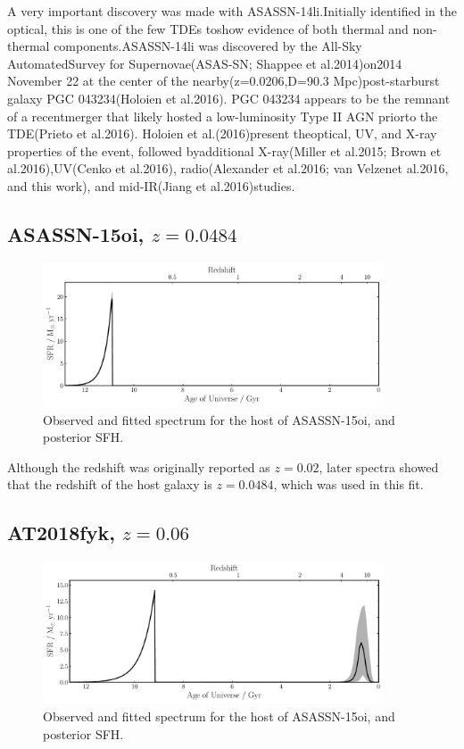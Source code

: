 \documentclass[a4paper,11pt]{article}
\begin{document}
A very important discovery was made with ASASSN-14li.Initially identified in the optical, this is one of the few TDEs toshow evidence of both thermal and non-thermal components.ASASSN-14li was discovered by the All-Sky AutomatedSurvey for Supernovae(ASAS-SN; Shappee et al.2014)on2014 November 22 at the center of the nearby(z=0.0206,D=90.3 Mpc)post-starburst galaxy PGC 043234(Holoien et al.2016). PGC 043234 appears to be the remnant of a recentmerger that likely hosted a low-luminosity Type II AGN priorto the TDE(Prieto et al.2016). Holoien et al.(2016)present theoptical, UV, and X-ray properties of the event, followed byadditional X-ray(Miller et al.2015; Brown et al.2016),UV(Cenko et al.2016), radio(Alexander et al.2016; van Velzenet al.2016, and this work), and mid-IR(Jiang et al.2016)studies.\cite{Romero_Canizales_2016}


\newpage
\subsection{ASASSN-15oi, $z=0.0484$}\label{sec:ASASSN-15oi}
\begin{figure}[h!]
\centering
  \includegraphics[width=0.9\textwidth]{../pipes/plots/r4_dblplaw_burst/ASASSN15oi_sfh.pdf}
  \caption{Observed and fitted spectrum for the host of ASASSN-15oi, and posterior SFH.}
  \label{}
\end{figure}

Although the redshift was originally reported as $z=0.02$, later spectra showed that the redshift of the host galaxy is $z=0.0484$, which was used in this fit.\cite{Arcavi_2015, Holoien_2016b}

\newpage
\subsection{AT2018fyk, $z=0.06$}\label{sec:AT2018fyk}
\begin{figure}[h!]
\centering
  \includegraphics[width=0.9\textwidth]{../pipes/plots/r4_dblplaw_burst/AT2018fyk_sfh.pdf}
  \caption{Observed and fitted spectrum for the host of ASASSN-15oi, and posterior SFH.}
  \label{}
\end{figure}
\end{document}
